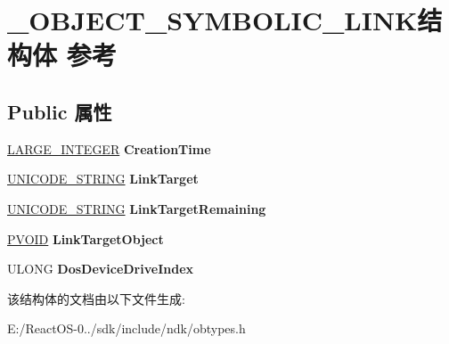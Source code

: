 \hypertarget{struct___o_b_j_e_c_t___s_y_m_b_o_l_i_c___l_i_n_k}{}\section{\+\_\+\+O\+B\+J\+E\+C\+T\+\_\+\+S\+Y\+M\+B\+O\+L\+I\+C\+\_\+\+L\+I\+N\+K结构体 参考}
\label{struct___o_b_j_e_c_t___s_y_m_b_o_l_i_c___l_i_n_k}
\subsection*{Public 属性}
\begin{DoxyCompactItemize}
\item 
\mbox{\label{struct___o_b_j_e_c_t___s_y_m_b_o_l_i_c___l_i_n_k_a6926ee635a0e0cdbeaa92e7e2af9a136}} 
\hyperlink{union___l_a_r_g_e___i_n_t_e_g_e_r}{L\+A\+R\+G\+E\+\_\+\+I\+N\+T\+E\+G\+ER} {\bfseries Creation\+Time}
\item 
\mbox{\label{struct___o_b_j_e_c_t___s_y_m_b_o_l_i_c___l_i_n_k_a265277a17ce08035ad9953d9e909631a}} 
\hyperlink{struct___u_n_i_c_o_d_e___s_t_r_i_n_g}{U\+N\+I\+C\+O\+D\+E\+\_\+\+S\+T\+R\+I\+NG} {\bfseries Link\+Target}
\item 
\mbox{\label{struct___o_b_j_e_c_t___s_y_m_b_o_l_i_c___l_i_n_k_a123cf02aa6c63f4cc60ad514f41264ed}} 
\hyperlink{struct___u_n_i_c_o_d_e___s_t_r_i_n_g}{U\+N\+I\+C\+O\+D\+E\+\_\+\+S\+T\+R\+I\+NG} {\bfseries Link\+Target\+Remaining}
\item 
\mbox{\label{struct___o_b_j_e_c_t___s_y_m_b_o_l_i_c___l_i_n_k_a85808ceb8a002dc53a1284bf568a8153}} 
\hyperlink{interfacevoid}{P\+V\+O\+ID} {\bfseries Link\+Target\+Object}
\item 
\mbox{\label{struct___o_b_j_e_c_t___s_y_m_b_o_l_i_c___l_i_n_k_a65f9f0cbc0ee3a299a93cfce6fc88eb2}} 
U\+L\+O\+NG {\bfseries Dos\+Device\+Drive\+Index}
\end{DoxyCompactItemize}


该结构体的文档由以下文件生成\+:\begin{DoxyCompactItemize}
\item 
E\+:/\+React\+O\+S-\/0../sdk/include/ndk/obtypes.\+h\end{DoxyCompactItemize}
